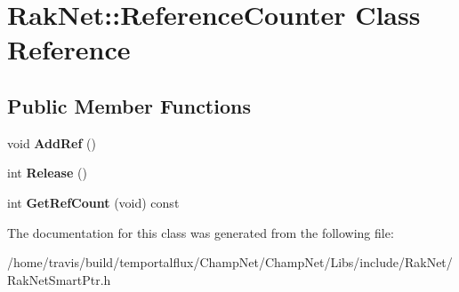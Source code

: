 \hypertarget{class_rak_net_1_1_reference_counter}{\section{Rak\-Net\-:\-:Reference\-Counter Class Reference}
\label{class_rak_net_1_1_reference_counter}
}
\subsection*{Public Member Functions}
\begin{DoxyCompactItemize}
\item 
\hypertarget{class_rak_net_1_1_reference_counter_aa999a2b907986c266766566d7f143988}{void {\bfseries Add\-Ref} ()}\label{class_rak_net_1_1_reference_counter_aa999a2b907986c266766566d7f143988}

\item 
\hypertarget{class_rak_net_1_1_reference_counter_ae20241d788bd62fe213edc61dd0a6a13}{int {\bfseries Release} ()}\label{class_rak_net_1_1_reference_counter_ae20241d788bd62fe213edc61dd0a6a13}

\item 
\hypertarget{class_rak_net_1_1_reference_counter_a10e29da1a6ad6375f0cfcf20780b67b1}{int {\bfseries Get\-Ref\-Count} (void) const }\label{class_rak_net_1_1_reference_counter_a10e29da1a6ad6375f0cfcf20780b67b1}

\end{DoxyCompactItemize}


The documentation for this class was generated from the following file\-:\begin{DoxyCompactItemize}
\item 
/home/travis/build/temportalflux/\-Champ\-Net/\-Champ\-Net/\-Libs/include/\-Rak\-Net/Rak\-Net\-Smart\-Ptr.\-h\end{DoxyCompactItemize}
